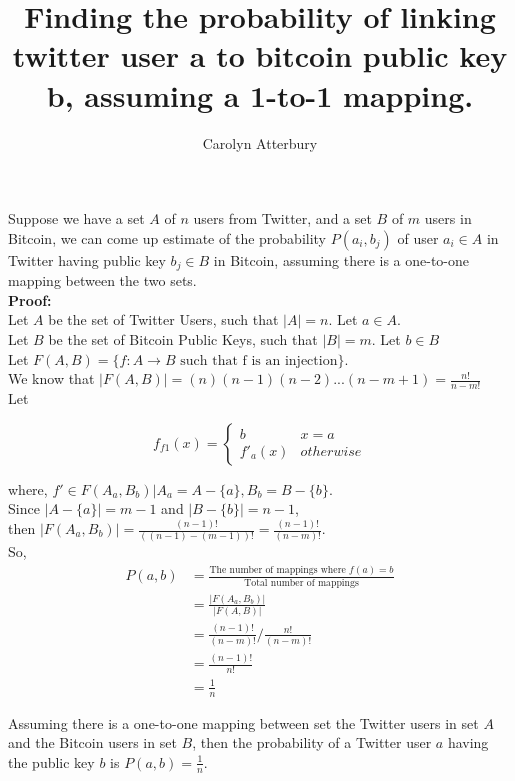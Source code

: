 \documentclass{article}
\title{Finding the probability of linking twitter user a to bitcoin public key
  b, assuming a 1-to-1 mapping.}
\author{Carolyn Atterbury}
\begin{document}
\maketitle

Suppose we have a set $A$ of $n$ users from Twitter, and a set $B$ of $m$ users
in Bitcoin, we can come up estimate of the probability $P(a_i, b_j)$ of user $a_i \in A$ in
Twitter having public key $b_j \in B$ in Bitcoin, assuming there is a one-to-one
mapping between the two sets. \\

\textbf{Proof:}\\

Let $A$ be the set of Twitter Users, such that $|A| = n$. Let $a \in A$.\\

Let $B$ be the set of Bitcoin Public Keys, such that $|B| = m$. Let $b \in B$\\

Let $F(A, B) = \{ f: A\rightarrow B \text{ such that f is an injection}\}$. \\

We know that $|F(A,B)| = (n)(n-1)(n-2)...(n-m+1) = \frac{n!}{n-m!}$\\

Let 

\[ f_{f1}(x) = 
  \begin{cases} 
      b & x = a \\
      f'_a(x) & otherwise
   \end{cases}
 \]

 where, $f' \in F(A_a, B_b) | A_a = A - \{ a\}, B_b = B - \{ b\}$. \\

 Since $|A-\{a\}| = m - 1$ and $|B-\{b\}| = n - 1$, \\
 
 then $|F(A_a, B_b)| = \frac{(n-1)!}{((n-1)- (m-1))!} = \frac{(n-1)!}{(n-m)!}$.\\

 So,
 \begin{align*}
   P(a,b) &= \frac{\text{The number of mappings where $f(a) = b$}}{\text{Total number of mappings}}\\
          &= \frac{|F(A_a, B_b)|}{|F(A,B)|}\\
          &= \frac{(n-1)!}{(n-m)!}/\frac{n!}{(n-m)!}\\
          &= \frac{(n-1)!}{n!}\\
            &= \frac{1}{n}
  \end{align*}

  Assuming there is a one-to-one mapping between set the Twitter users in set
  $A$ and the Bitcoin users in set $B$, then the probability of a Twitter user
  $a$ having the public key $b$ is $P(a,b) = \frac{1}{n}$.


 
\end{document}
